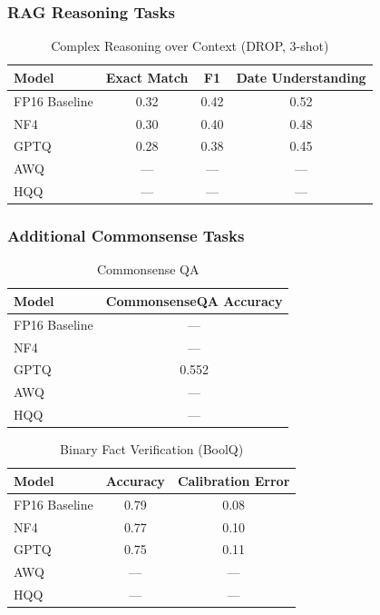 \subsubsection{RAG Reasoning Tasks}

\begin{table}[h]
\centering
\caption{Complex Reasoning over Context (DROP, 3-shot)}
\label{tab:rag_reasoning}
\begin{tabular}{@{}lccc@{}}
\toprule
\textbf{Model} & \textbf{Exact Match} & \textbf{F1} & \textbf{Date Understanding} \\
\midrule
FP16 Baseline & 0.32 & 0.42 & 0.52 \\
NF4 & 0.30 & 0.40 & 0.48 \\
GPTQ & 0.28 & 0.38 & 0.45 \\
AWQ & --- & --- & --- \\
HQQ & --- & --- & --- \\
\bottomrule
\end{tabular}
\end{table}

\subsubsection{Additional Commonsense Tasks}

\begin{table}[h]
\centering
\caption{Commonsense QA}
\label{tab:commonsense_qa}
\begin{tabular}{@{}lc@{}}
\toprule
\textbf{Model} & \textbf{CommonsenseQA Accuracy} \\
\midrule
FP16 Baseline & --- \\
NF4 & --- \\
GPTQ & 0.552 \\
AWQ & --- \\
HQQ & --- \\
\bottomrule
\end{tabular}
\end{table}

\begin{table}[h]
\centering
\caption{Binary Fact Verification (BoolQ)}
\label{tab:verification}
\begin{tabular}{@{}lcc@{}}
\toprule
\textbf{Model} & \textbf{Accuracy} & \textbf{Calibration Error} \\
\midrule
FP16 Baseline & 0.79 & 0.08 \\
NF4 & 0.77 & 0.10 \\
GPTQ & 0.75 & 0.11 \\
AWQ & --- & --- \\
HQQ & --- & --- \\
\bottomrule
\end{tabular}
\end{table}

